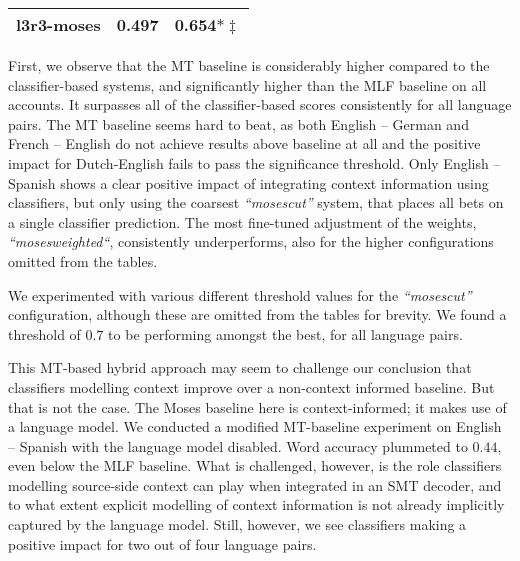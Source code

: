 \begin{table}[htb]
\begin{center}
\begin{tabular}{|l|rr|}
l3r3-moses & 0.497 & 0.654$*\ddagger$ \\%
\hline
\end{tabular}
\end{center}
\end{table}

First, we observe that the MT baseline is considerably higher compared to the
classifier-based systems, and significantly higher than the MLF baseline on all
accounts. It surpasses all of the classifier-based scores consistently for all
language pairs. The MT baseline seems hard to beat, as both English -- German
and French -- English do not achieve results above baseline at all and the
positive impact for Dutch-English fails to pass the significance threshold.
Only English -- Spanish shows a clear positive impact of integrating context
information using classifiers, but only using the coarsest \emph{``mosescut''}
system, that places all bets on a single classifier prediction. The most
fine-tuned adjustment of the weights, \emph{``mosesweighted``}, consistently
underperforms, also for the higher configurations omitted from the tables.

We experimented with various different threshold values for the \emph{``mosescut''}
configuration, although these are omitted from the tables for brevity. We found
a threshold of $0.7$ to be performing amongst the best, for all language pairs.

This MT-based hybrid approach may seem to challenge our conclusion that classifiers
modelling context improve over a non-context informed baseline. But that is not
the case. The Moses baseline here is context-informed; it makes use of
a language model. We conducted a modified MT-baseline experiment on
English -- Spanish with the language model disabled. Word accuracy plummeted to
$0.44$, even below the MLF baseline. What is challenged, however, is the role
classifiers modelling source-side context can play when integrated in an SMT
decoder, and to what extent explicit modelling of context information is not
already implicitly captured by the language model. Still, however, we see
classifiers making a positive impact for two out of four language pairs.

